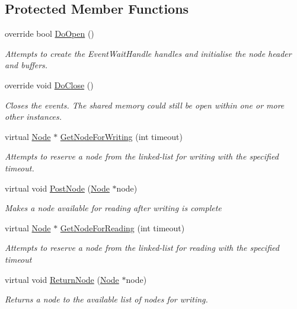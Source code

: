 \subsection*{Protected Member Functions}
\begin{DoxyCompactItemize}
\item 
override bool \hyperlink{class_shared_memory_1_1_circular_buffer_aff62bc6b9dbca60658ab979762dd073d}{Do\+Open} ()
\begin{DoxyCompactList}\small\item\em Attempts to create the Event\+Wait\+Handle handles and initialise the node header and buffers. \end{DoxyCompactList}\item 
override void \hyperlink{class_shared_memory_1_1_circular_buffer_a29c1e46f0d8a3b95c83a361ac7f84194}{Do\+Close} ()
\begin{DoxyCompactList}\small\item\em Closes the events. The shared memory could still be open within one or more other instances. \end{DoxyCompactList}\item 
virtual \hyperlink{struct_shared_memory_1_1_circular_buffer_1_1_node}{Node} $\ast$ \hyperlink{class_shared_memory_1_1_circular_buffer_acbe3706f03284bceb02fde3b6dc2fcbe}{Get\+Node\+For\+Writing} (int timeout)
\begin{DoxyCompactList}\small\item\em Attempts to reserve a node from the linked-\/list for writing with the specified timeout. \end{DoxyCompactList}\item 
virtual void \hyperlink{class_shared_memory_1_1_circular_buffer_a76ce3579d8c7254fbd8e5b1bc32eafd1}{Post\+Node} (\hyperlink{struct_shared_memory_1_1_circular_buffer_1_1_node}{Node} $\ast$node)
\begin{DoxyCompactList}\small\item\em Makes a node available for reading after writing is complete \end{DoxyCompactList}\item 
virtual \hyperlink{struct_shared_memory_1_1_circular_buffer_1_1_node}{Node} $\ast$ \hyperlink{class_shared_memory_1_1_circular_buffer_a2d906a5fe33490932bec3417750e5d6f}{Get\+Node\+For\+Reading} (int timeout)
\begin{DoxyCompactList}\small\item\em Attempts to reserve a node from the linked-\/list for reading with the specified timeout \end{DoxyCompactList}\item 
virtual void \hyperlink{class_shared_memory_1_1_circular_buffer_ae7b68568186c9e2324d36990b3f2e101}{Return\+Node} (\hyperlink{struct_shared_memory_1_1_circular_buffer_1_1_node}{Node} $\ast$node)
\begin{DoxyCompactList}\small\item\em Returns a node to the available list of nodes for writing. \end{DoxyCompactList}\end{DoxyCompactItemize}
